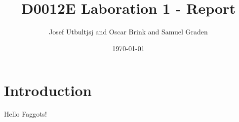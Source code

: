 \documentclass{article}
\title{D0012E Laboration 1 - Report}
\author{Josef Utbultjsj and Oscar Brink and Samuel Graden}
\date{\today}
\begin{document}
\maketitle

\section{Introduction}

	Hello Faggots!	
\end{document}
